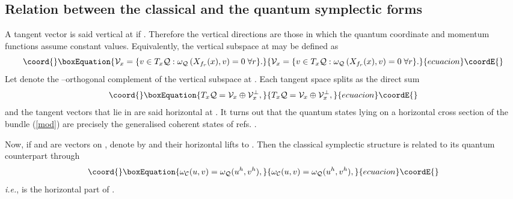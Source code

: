 \documentclass[a4paper,a4paper]{article}
\begin{document}
\subsection{Relation between the classical and the quantum symplectic forms}\label{hori}

A tangent vector \coordHE{} is said vertical at \coordHE{} 
if \coordHE{}  \coordHE{}. Therefore the vertical directions are those 
in which the quantum coordinate and momentum functions assume constant values.
Equivalently, the vertical subspace \coordHE{} at \coordHE{} may be defined as
\begin{equation}\coord{}\boxEquation{
{\cal V}_x = \{v\in T_x{\cal Q}: \omega_{\cal Q}\left(X_{f_r}(x), 
v\right)=0\; \forall r\}.
\label{vvert}
}{
{\cal V}_x = \{v\in T_x{\cal Q}: \omega_{\cal Q}\left(X_{f_r}(x), 
v\right)=0\; \forall r\}.
}{ecuacion}\coordE{}\end{equation}
Let \coordHE{} denote the \coordHE{}--orthogonal 
complement of the vertical subspace at \coordHE{}. Each tangent space 
splits as the direct sum
\begin{equation}\coord{}\boxEquation{
T_x{\cal Q}={\cal V}_x\oplus {\cal V}_x^{\perp},
\label{split}
}{
T_x{\cal Q}={\cal V}_x\oplus {\cal V}_x^{\perp},
}{ecuacion}\coordE{}\end{equation}
and the tangent vectors that lie in \coordHE{} are said horizontal at \coordHE{}. 
It turns out that the quantum states lying on a horizontal cross section of the 
bundle (\ref{mod}) are precisely the generalised coherent states of refs. 
\cite{COHST, PERELOMOV}.

Now, if \coordHE{} and \coordHE{} are vectors on \coordHE{}, denote by \coordHE{} and \coordHE{} 
their horizontal lifts to \coordHE{}. Then the classical symplectic 
structure \coordHE{} is related to its quantum 
counterpart \coordHE{} through 
\begin{equation}\coord{}\boxEquation{
\omega_{\cal C}(u,v)=\omega_{\cal Q}(u^h, v^h),
\label{lift}
}{
\omega_{\cal C}(u,v)=\omega_{\cal Q}(u^h, v^h),
}{ecuacion}\coordE{}\end{equation}
{\it i.e.}, \coordHE{} is the horizontal part of \coordHE{}. 
\end{document}
